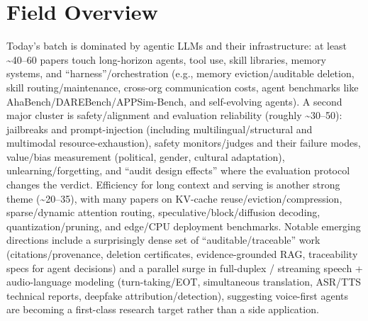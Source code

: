 \documentclass[12pt,letterpaper]{article}
\begin{document}
\section*{Field Overview}
{\footnotesize Today's batch is dominated by agentic LLMs and their infrastructure: at least \textasciitilde{}40--60 papers touch long-horizon agents, tool use, skill libraries, memory systems, and ``harness''/orchestration (e.g., memory eviction/auditable deletion, skill routing/maintenance, cross-org communication costs, agent benchmarks like AhaBench/DAREBench/APPSim-Bench, and self-evolving agents). A second major cluster is safety/alignment and evaluation reliability (roughly \textasciitilde{}30--50): jailbreaks and prompt-injection (including multilingual/structural and multimodal resource-exhaustion), safety monitors/judges and their failure modes, value/bias measurement (political, gender, cultural adaptation), unlearning/forgetting, and ``audit design effects'' where the evaluation protocol changes the verdict. Efficiency for long context and serving is another strong theme (\textasciitilde{}20--35), with many papers on KV-cache reuse/eviction/compression, sparse/dynamic attention routing, speculative/block/diffusion decoding, quantization/pruning, and edge/CPU deployment benchmarks. Notable emerging directions include a surprisingly dense set of ``auditable/traceable'' work (citations/provenance, deletion certificates, evidence-grounded RAG, traceability specs for agent decisions) and a parallel surge in full-duplex / streaming speech + audio-language modeling (turn-taking/EOT, simultaneous translation, ASR/TTS technical reports, deepfake attribution/detection), suggesting voice-first agents are becoming a first-class research target rather than a side application.}
\end{document}
